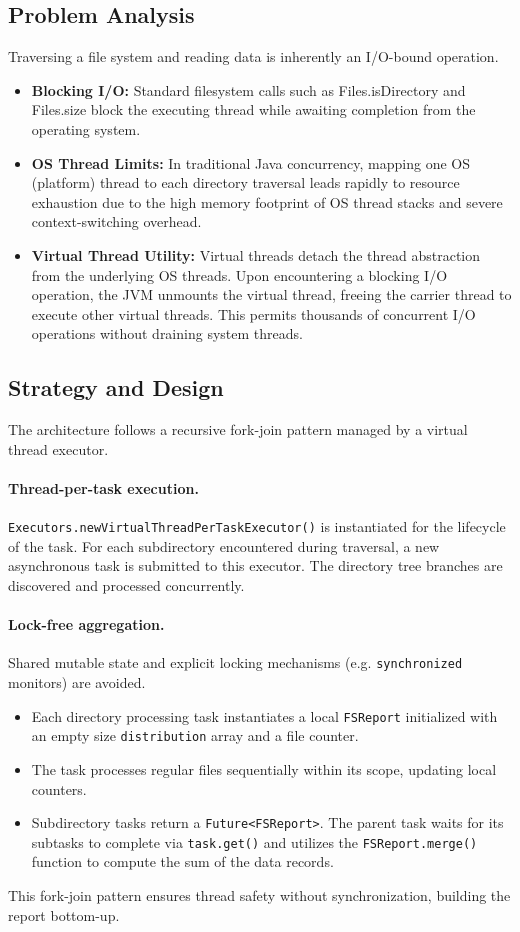 \documentclass{scrartcl}
\begin{document}
\subsection{Problem Analysis}
Traversing a file system and reading data is inherently an I/O-bound operation.
\begin{itemize}
    \item \textbf{Blocking I/O:} Standard filesystem calls such as Files.isDirectory and Files.size block the executing thread while awaiting completion from the operating system.
    \item \textbf{OS Thread Limits:} In traditional Java concurrency, mapping one OS (platform) thread to each directory traversal leads rapidly to resource exhaustion due to the high memory footprint of OS thread stacks and severe context-switching overhead.
    \item \textbf{Virtual Thread Utility:} Virtual threads detach the thread abstraction from the underlying OS threads. Upon encountering a blocking I/O operation, the JVM unmounts the virtual thread, freeing the carrier thread to execute other virtual threads. This permits thousands of concurrent I/O operations without draining system threads.
\end{itemize}

\subsection{Strategy and Design}
The architecture follows a recursive fork-join pattern managed by a virtual thread executor.

\paragraph{Thread-per-task execution.}
\texttt{Executors.newVirtualThreadPerTaskExecutor()} is instantiated for the lifecycle of the task. For each subdirectory encountered during traversal, a new asynchronous task is submitted to this executor. The directory tree branches are discovered and processed concurrently.

\paragraph{Lock-free aggregation.}
Shared mutable state and explicit locking mechanisms (e.g. \texttt{synchronized} monitors) are avoided.
\begin{itemize}
    \item Each directory processing task instantiates a local \texttt{FSReport} initialized with an empty size \texttt{distribution} array and a file counter.
    \item The task processes regular files sequentially within its scope, updating local counters.
    \item Subdirectory tasks return a \texttt{Future<FSReport>}. The parent task waits for its subtasks to complete via \texttt{task.get()} and utilizes the \texttt{FSReport.merge()} function to compute the sum of the data records.
\end{itemize}
This fork-join pattern ensures thread safety without synchronization, building the report bottom-up.
\end{document}
